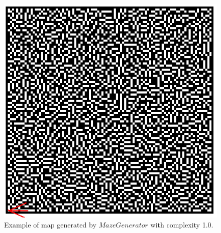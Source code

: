 \begin{figure}[H]
\centering
\includegraphics[width=\columnwidth]{images/maze1.png}
\caption{Example of map generated by $MazeGenerator$ with complexity 1.0.}
\label{fig:maze1}
\end{figure}
